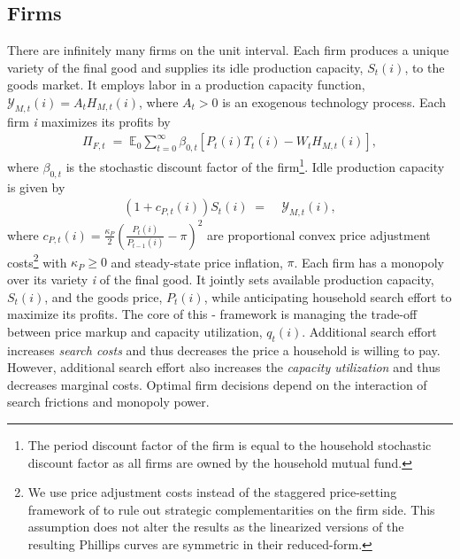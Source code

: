 \documentclass[12pt,3p,authoryear,review]{elsarticle}
\begin{document}
\subsection{Firms}%
There are infinitely many firms on the unit interval. Each firm produces a unique variety of the final good and supplies its idle production capacity, $S_t(i)$, to the goods market. It employs labor in a production capacity function, $\mathcal{Y}_{M,t}(i) = A_t H_{M,t}(i)$, where $A_t>0$ is an exogenous technology process. Each firm \textit{i} maximizes its profits by%
\begin{align*}%
 	\Pi_{F,t} \; = \; \mathbb{E}_0 \sum_{t=0}^{\infty} \beta_{0,t} \left[ P_t(i) T_t(i) - W_t H_{M,t}(i) \right],%
\end{align*}%
where $\beta_{0,t}$ is the stochastic discount factor of the firm\footnote{The period discount factor of the firm is equal to the household stochastic discount factor as all firms are owned by the household mutual fund.}. Idle production capacity is given by%
\begin{align}%
 	\left(1+c_{P,t}(i)\right) S_t(i) \; = & \; \mathcal{Y}_{M,t}(i),%
\end{align}%
where $c_{P,t}(i) = \frac{\kappa_P}{2} \left( \frac{P_{t}(i)}{P_{t-1}(i)} - \pi \right)^2$ are proportional convex \cite{rotembergMonopolisticPriceAdjustment1982} price adjustment costs\footnote{We use \cite{rotembergMonopolisticPriceAdjustment1982} price adjustment costs instead of the staggered price-setting framework of \cite{calvoStaggeredPricesUtilitymaximizing1983} to rule out strategic complementarities on the firm side. This assumption does not alter the results as the linearized versions of the resulting Phillips curves are symmetric in their reduced-form.} with $\kappa_P \geq 0$ and steady-state price inflation, $\pi$. Each firm has a monopoly over its variety \textit{i} of the final good. It jointly sets available production capacity, $S_t(i)$, and the goods price, $P_t(i)$, while anticipating household search effort to maximize its profits. The core of this \cite{moenCompetitiveSearchEquilibrium1997}-\cite{rotembergMonopolisticPriceAdjustment1982} framework is managing the trade-off between price markup and capacity utilization, $q_t(i)$. Additional search effort increases \emph{search costs} and thus decreases the price a household is willing to pay. However, additional search effort also increases the \emph{capacity utilization} and thus decreases marginal costs. Optimal firm decisions depend on the interaction of search frictions and monopoly power.%
\end{document}
